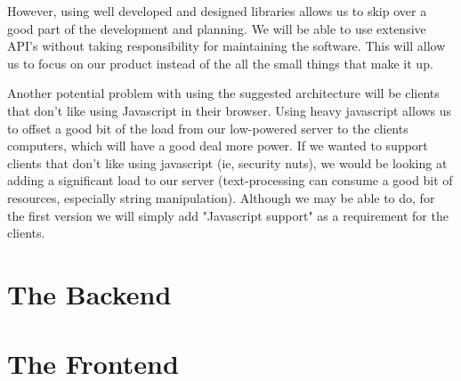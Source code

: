However, using well developed and designed libraries allows us to skip over a good part of the development and planning.
We will be able to use extensive API's without taking responsibility for maintaining the software.
This will allow us to focus on our product instead of the all the small things that make it up.


Another potential problem with using the suggested architecture will be clients that don't like using Javascript in their browser.
Using heavy javascript allows us to offset a good bit of the load from our low-powered server to the clients computers, which will have a good deal more power.
If we wanted to support clients that don't like using javascript (ie, security nuts), we would be looking at adding a significant load to our server (text-processing can consume a good bit of resources, especially string manipulation).
Although we may be able to do, for the first version we will simply add "Javascript support" as a requirement for the clients.

\section{The Backend}








\section{The Frontend}









